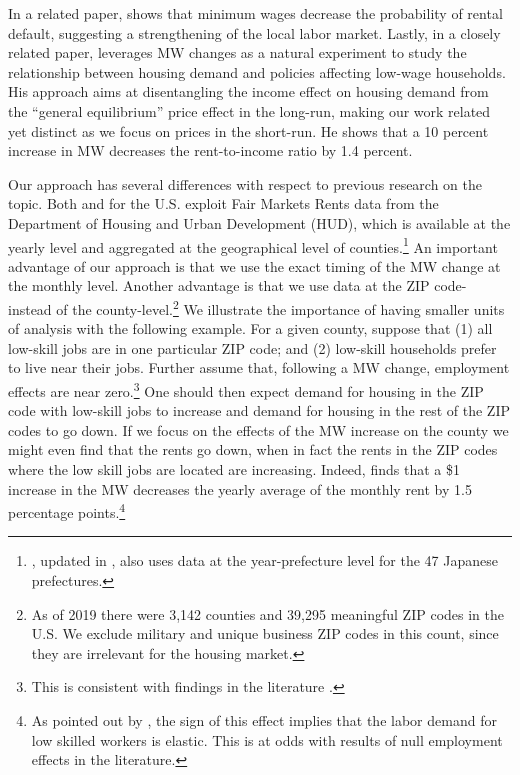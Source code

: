 In a related paper, \textcite{AgarwalEtAl2019} shows that minimum wages decrease the 
probability of rental default, suggesting a strengthening of the local labor market. 
Lastly, in a closely related paper, \textcite{Hughes2020} leverages MW changes as a 
natural experiment to study the relationship between housing demand and policies 
affecting low-wage households. His approach aims at disentangling the income effect 
on housing demand from the ``general equilibrium'' price effect in the long-run, 
making our work related yet distinct as we focus on prices in the short-run. He shows 
that a 10 percent increase in MW decreases the rent-to-income ratio by 1.4 percent.

Our approach has several differences with respect to previous research on the topic.
Both \textcite{Tidemann2018} and \textcite{Yamagishi2019} for the U.S. exploit Fair 
Markets Rents data from the Department of Housing and Urban Development (HUD), which is 
available at the yearly level and aggregated at the geographical level of 
counties.\footnote{\textcite{Yamagishi2019}, updated in \textcite{Yamagishi2021}, also 
	uses data at the year-prefecture level for the 47 Japanese prefectures.}
An important advantage of our approach is that we use the exact timing of the MW change 
at the monthly level.
Another advantage is that we use data at the ZIP code- instead of the 
county-level.\footnote{As of 2019 there were 3,142 counties and 39,295 meaningful ZIP 
	codes in the U.S. We exclude military and unique business ZIP codes in this count, 
	since they are irrelevant for the housing market.} 
We illustrate the importance of having smaller units of analysis with the following 
example.
For a given county, suppose that (1) all low-skill jobs are in one particular ZIP code; 
and (2) low-skill households prefer to live near their jobs. Further assume that, 
following a MW change, employment effects are near zero.\footnote{This is consistent with 
findings in the literature \parencite[for a comprehensive review see][]{Dube2019}.} 
One should then expect demand for housing in the ZIP code with low-skill jobs to increase 
and demand for housing in the rest of the ZIP codes to go down.
If we focus on the effects of the MW increase on the county we might even find that the 
rents go down, when in fact the rents in the ZIP codes where the low skill jobs are 
located are increasing.
Indeed, \textcite{Tidemann2018} finds that a \$1 increase in the MW decreases the yearly 
average of the monthly rent by 1.5 percentage points.\footnote{As pointed out by 
	\textcite{Tidemann2018}, the sign of this effect implies that the labor demand for 
	low skilled workers is elastic. This is at odds with results of null employment 
	effects in the literature.} 

